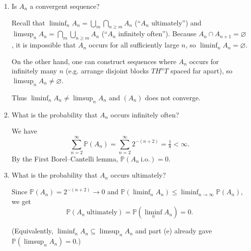 \documentclass[dvipsnames,11pt]{article}
\begin{document}
\begin{enumerate}[label=\alph*.]
\begin{solution}
            \end{solution}
            
        \item Is $A_n$ a convergent sequence?
    
            \begin{solution}
    
                Recall that $\liminf_n A_n=\bigcup_{m}\bigcap_{n\ge m}A_n$ (“$A_n$ ultimately”) and  $\limsup_n A_n=\bigcap_{m}\bigcup_{n\ge m}A_n$ (“$A_n$ infinitely often”). Because $A_n\cap A_{n+1}=\varnothing$, it is impossible that $A_n$ occurs for all sufficiently large $n$, so $\liminf_n A_n=\varnothing$. 
                
                On the other hand, one can construct sequences where $A_n$ occurs for infinitely many $n$ (e.g. arrange disjoint blocks $TH^nT$ spaced far apart), so $\limsup_n A_n\neq\varnothing$. 
                
                Thus $\liminf_n A_n\ne\limsup_n A_n$ and $(A_n)$ does not converge.
                
            \end{solution}
            
        \item What is the probability that $A_n$ occurs infinitely often?
    
            \begin{solution}

                We have 
                \[
                \sum_{n=2}^\infty \mathbb P(A_n)=\sum_{n=2}^\infty 2^{-(n+2)}=\tfrac18<\infty.
                \]
                By the First Borel–Cantelli lemma, $\mathbb P(A_n\ \text{i.o.})=0$.
                
            \end{solution}
            
        \item What is the probability that $A_n$ occurs ultimately?
    
            \begin{solution}
    
                Since $\mathbb P(A_n)=2^{-(n+2)}\to 0$ and $\mathbb P(\liminf_n A_n)\le \liminf_{n\to\infty}\mathbb P(A_n)$, we get 
                \[ \mathbb P(A_n\ \text{ultimately})=\mathbb P(\liminf_n A_n)=0.
                \] 
                
                (Equivalently, $\liminf_n A_n\subseteq \limsup_n A_n$ and part (e) already gave $\mathbb P(\limsup_n A_n)=0$.)
                
            \end{solution}
            
    \end{enumerate}
\end{document}
